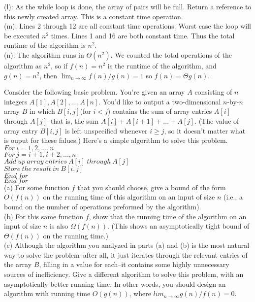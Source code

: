 \documentclass{assignment}
\begin{document}
\begin{problemlist}
\begin{answer}
(l): As the while loop is done, the array of pairs will be full. Return a reference to this newly created array. This is a constant time operation.\\
(m): Lines 2 through 12 are all constant time operations. Worst case the loop will be executed $n^2$ times. Lines 1 and 16 are both constant time. Thus the total runtime of the algorithm is $n^2$. \\
(n): The algorithm runs in $\Theta (n^2)$. We counted the total operations of the algorithm as $n^2$, so if $f(n)=n^2$ is the runtime of the algorithm, and $g(n)=n^2$, then $\lim_{n\rightarrow \infty} f(n)/g(n) = 1$ so $f(n)=\Theta g(n)$.\\
\end{answer}
\clearpage
\pbitem
\begin{problem}
Consider the following basic problem. You're given an array $A$ consisting of $n$ integers $A[1],A[2],...,A[n]$. You'd like to output a two-dimensional $n$-by-$n$ array $B$ in which $B[i,j]$(for $i<j$) contains the sum of array entries $A[i]$ through $A[j]$--that is, the sum $A[i]+A[i+1]+...+A[j]$. (The value of array entry $B[i,j]$ is left unspecified whenever $i\ge j$, so it doesn't matter what is ouput for these falues.) Here's a simple algorithm to solve this problem.\\
$For~i=1,2,...,n$\\
$For~j=i+1,i+2,...,n$\\
$Add~up~array~entries~A[i]~through~A[j]$\\
$Store~the~result~in~B[i,j]$\\
$End~for$\\
$End~for$\\
(a) For some function $f$ that you should choose, give a bound of the form $O(f(n))$ on the running time of this algorithm on an input of size $n$ (i.e., a bound on the number of operations preformed by the algorithm).\\
(b) For this same function $f$, show that the running time of the algorithm on an input of size $n$ is also $\Omega (f(n))$. (This shows an asymptotically tight bound of $\Theta (f(n))$ on the running time.)\\
(c) Although the algorithm you analyzed in parts (a) and (b) is the most natural way to solve the problem--after all, it just iterates through the relevant entries of the array $B$, filling in a value for each--it contains some highly unnecessary sources of inefficiency. Give a different algorithm to solve this problem, with an asymptotically better running time. In other words, you should design an algorithm with running time $O(g(n))$, where $lim_{n\rightarrow \infty}g(n)/f(n)=0$.

\end{problem}
\end{problemlist}
\end{document}
